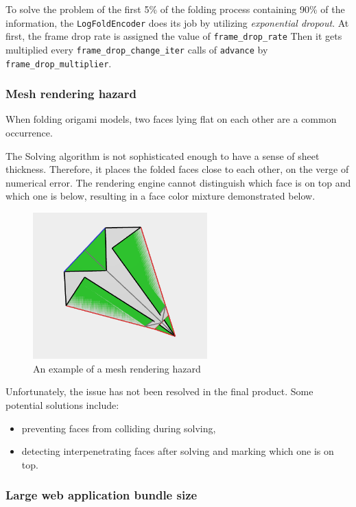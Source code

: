 To solve the problem of the first 5\% of the folding process containing 90\% of the information, the
\texttt{LogFoldEncoder} does its job by utilizing \textit{exponential dropout}.
At first, the frame drop rate is assigned the value of \texttt{frame\_drop\_rate}
Then it gets multiplied every \texttt{frame\_drop\_change\_iter} calls of \texttt{advance}
by \texttt{frame\_drop\_multiplier}.

\subsubsection{Mesh rendering hazard}

When folding origami models, two faces lying flat on each other are a common occurrence.

The Solving algorithm is not sophisticated enough to have a sense of sheet thickness. Therefore, it places the folded faces close to each other, on the verge of numerical error. The rendering engine cannot distinguish which face is on top and which one is below, resulting in a face color mixture demonstrated below.

\begin{figure}[H]
	\caption{An example of a mesh rendering hazard}
  \centering
    \includegraphics[width=0.6\textwidth]{assets/3-rendering-hazard.png}
\end{figure}

Unfortunately, the issue has not been resolved in the final product. Some potential solutions include:
\begin{itemize}
	\item preventing faces from colliding during solving,
	\item detecting interpenetrating faces after solving and marking which one is on top.
\end{itemize}

\subsubsection{Large web application bundle size}

